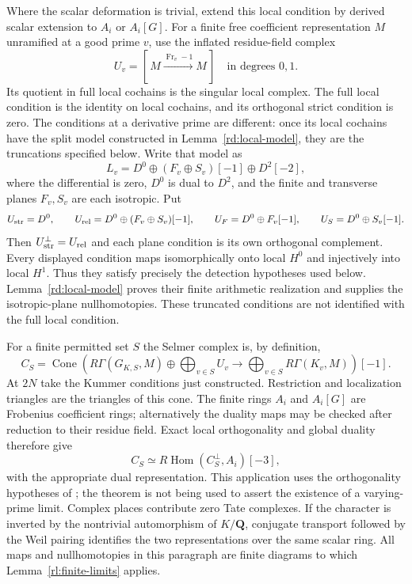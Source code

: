 Where the scalar deformation is trivial, extend this local condition by
derived scalar extension to $A_i$ or $A_i[G]$.  For a finite free
coefficient representation $M$ unramified at a good prime $v$, use the
inflated residue-field complex
\[
 U_v=[\,M\xrightarrow{\operatorname{Fr}_v-1}M\,]
 \quad\text{in degrees }0,1.
\]
Its quotient in full local cochains is the singular local complex.
The full local condition is the identity on local cochains, and its
orthogonal strict condition is zero.  The conditions at a derivative
prime are different: once its local cochains have the split model
constructed in Lemma~\ref{rd:local-model}, they are the truncations
specified below.  Write that model as
\[
 L_v=D^0\oplus(F_v\oplus S_v)[-1]\oplus D^2[-2],
\]
where the differential is zero, $D^0$ is dual to $D^2$, and the finite
and transverse planes $F_v,S_v$ are each isotropic.  Put
\[
 U_{\rm str}=D^0,\qquad
 U_{\rm rel}=D^0\oplus(F_v\oplus S_v)[-1],\qquad
 U_F=D^0\oplus F_v[-1],\qquad U_S=D^0\oplus S_v[-1].
\]
Then $U_{\rm str}^{\perp}=U_{\rm rel}$ and each plane condition is
its own orthogonal complement.  Every displayed condition maps
isomorphically onto local $H^0$ and injectively into local $H^1$.
Thus they satisfy precisely the detection hypotheses used below.
Lemma~\ref{rd:local-model} proves their finite arithmetic realization
and supplies the isotropic-plane nullhomotopies.  These truncated
conditions are not identified with the full local condition.

For a finite permitted set $S$ the Selmer complex is, by definition,
\begin{equation}\label{rl:selmer-definition}
 C_S=\operatorname{Cone}\left(
 R\Gamma(G_{K,S},M)\oplus\bigoplus_{v\in S}U_v
 \longrightarrow\bigoplus_{v\in S}R\Gamma(K_v,M)
 \right)[-1].
\end{equation}
At $2N$ take the Kummer conditions just constructed.  Restriction and
localization triangles are the triangles of this cone.  The finite rings
$A_i$ and $A_i[G]$ are Frobenius coefficient rings; alternatively the
duality maps may be checked after reduction to their residue field.
Exact local orthogonality and global duality therefore give
\begin{equation}\label{rl:global-duality}
 C_S\simeq R\operatorname{Hom}(C_S^{\perp},A_i)[-3],
\end{equation}
with the appropriate dual representation.  This application uses the
orthogonality hypotheses of
\cite[Theorem~6.3.4]{Nekovar2006}; the theorem is not being used to assert
the existence of a varying-prime limit.  Complex places contribute zero
Tate complexes.  If the character is inverted by the nontrivial
automorphism of $K/\mathbf Q$, conjugate transport followed by the Weil
pairing identifies the two representations over the same scalar ring.
All maps and nullhomotopies in this paragraph are finite diagrams to
which Lemma~\ref{rl:finite-limits} applies.

